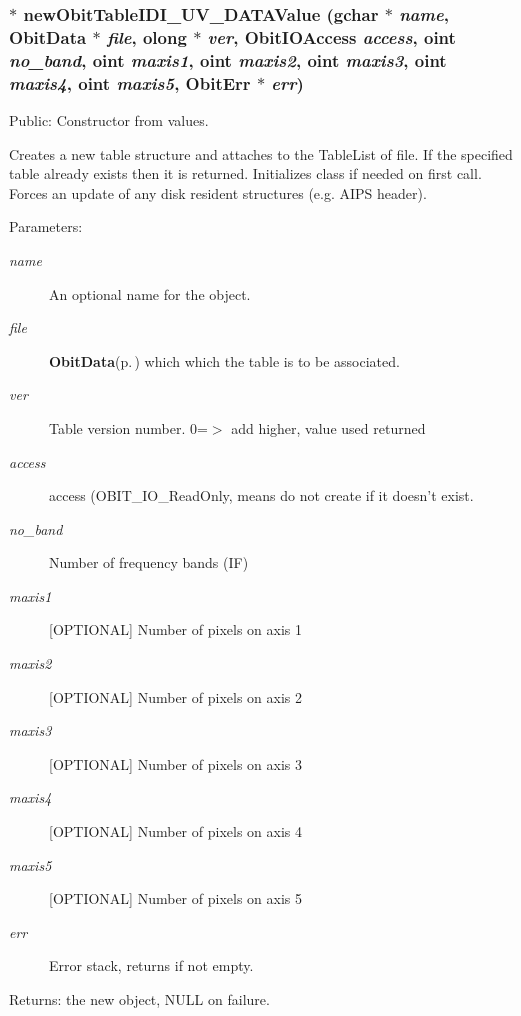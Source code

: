 \subsubsection{$\ast$ new\-Obit\-Table\-IDI\_\-UV\_\-DATAValue (gchar $\ast$ {\em name}, {\bf Obit\-Data} $\ast$ {\em file}, {\bf olong} $\ast$ {\em ver}, Obit\-IOAccess {\em access}, {\bf oint} {\em no\_\-band}, {\bf oint} {\em maxis1}, {\bf oint} {\em maxis2}, {\bf oint} {\em maxis3}, {\bf oint} {\em maxis4}, {\bf oint} {\em maxis5}, {\bf Obit\-Err} $\ast$ {\em err})}\label{ObitTableIDI__UV__DATA_8c_a18}


Public: Constructor from values. 

Creates a new table structure and attaches to the Table\-List of file. If the specified table already exists then it is returned. Initializes class if needed on first call. Forces an update of any disk resident structures (e.g. AIPS header). \begin{Desc}
\item[Parameters:]
\begin{description}
\item[{\em name}]An optional name for the object. \item[{\em file}]{\bf Obit\-Data}{\rm (p.\,\pageref{structObitData})} which which the table is to be associated. \item[{\em ver}]Table version number. 0=$>$ add higher, value used returned \item[{\em access}]access (OBIT\_\-IO\_\-Read\-Only, means do not create if it doesn't exist. \item[{\em no\_\-band}]Number of frequency bands (IF) \item[{\em maxis1}][OPTIONAL] Number of pixels on axis 1 \item[{\em maxis2}][OPTIONAL] Number of pixels on axis 2 \item[{\em maxis3}][OPTIONAL] Number of pixels on axis 3 \item[{\em maxis4}][OPTIONAL] Number of pixels on axis 4 \item[{\em maxis5}][OPTIONAL] Number of pixels on axis 5 \item[{\em err}]Error stack, returns if not empty. \end{description}
\end{Desc}
\begin{Desc}
\item[Returns:]the new object, NULL on failure. \end{Desc}
